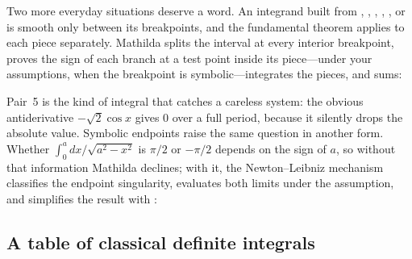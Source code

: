 Two more everyday situations deserve a word. An integrand built from ,
, , , , or  is smooth only between its
breakpoints, and the fundamental theorem applies to each
piece separately. Mathilda splits the interval at every interior breakpoint, proves
the sign of each branch at a test point inside its piece---under your assumptions,
when the breakpoint is symbolic---integrates the pieces, and sums:

\begin{codepairs}
\end{codepairs}

Pair~5 is the kind of integral that catches a careless system: the obvious
antiderivative \(-\sqrt2\cos x\) gives \(0\) over a full period, because it silently
drops the absolute value. Symbolic endpoints raise the same question in another
form. Whether \(\int_0^a dx/\sqrt{a^2-x^2}\) is \(\pi/2\) or \(-\pi/2\) depends on the
sign of \(a\), so without that information Mathilda declines; with it, the
Newton--Leibniz mechanism classifies the endpoint singularity, evaluates both limits
under the assumption, and simplifies the result with :

\begin{codepairs}
\end{codepairs}

\subsection{A table of classical definite integrals}
\label{ssec:calc-classical}

